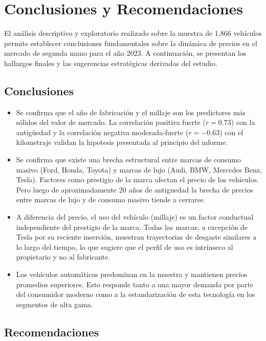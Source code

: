 \documentclass[oneside,11pt]{Latex/Classes/PhDthesisPSnPDF}
\begin{document}
\chapter{Conclusiones y Recomendaciones}

El análisis descriptivo y exploratorio realizado sobre la muestra de
1,866 vehículos permite establecer conclusiones fundamentales sobre la
dinámica de precios en el mercado de segunda mano para el año 2023. A
continuación, se presentan los hallazgos finales y las sugerencias
estratégicas derivadas del estudio.

\section {Conclusiones}

\begin{itemize}

\item Se confirma que el año de fabricación y el millaje son los predictores más sólidos del valor de mercado. La correlación positiva fuerte ($r = 0.73$) con la antigüedad y la correlación negativa moderada-fuerte ($r = -0.63$) con el kilometraje validan la hipotesis presentada al principio del informe.

\item Se confirma que existe una brecha estructural entre marcas de consumo masivo (Ford, Honda, Toyota) y marcas de lujo (Audi, BMW, Mercedes Benz, Tesla). Factores como prestigio de la marca afectan el precio de los vehiculos. Pero luego de aproximadamente 20 años de antiguedad la brecha de precios entre marcas de lujo y de consumo masivo tiende a cerrarse.

\item A diferencia del precio, el uso del vehículo (millaje) es un factor conductual independiente del prestigio de la marca. Todas las marcas, a excepción de Tesla por su reciente inserción, muestran trayectorias de desgaste similares a lo largo del tiempo, lo que sugiere que el perfil de uso es intrínseco al propietario y no al fabricante.

\item Los vehículos automáticos predominan en la muestra y mantienen precios promedios superiores. Esto responde tanto a una mayor demanda por parte del consumidor moderno como a la estandarización de esta tecnología en los segmentos de alta gama.
\end{itemize}

\section {Recomendaciones}
\end{document}
